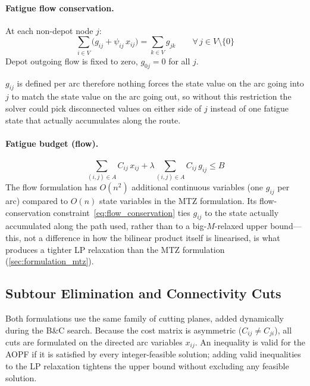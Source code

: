 \documentclass[11pt,a4paper]{article}
\begin{document}
\paragraph{Fatigue flow conservation.}
At each non-depot node $j$:
\begin{equation}
  \sum_{i \in V} \bigl(g_{ij} + \psi_{ij} \, x_{ij}\bigr) = \sum_{k \in V} g_{jk} \qquad \forall\, j \in V \setminus \{0\}
  \label{eq:flow_conservation}
\end{equation}
Depot outgoing flow is fixed to zero, $g_{0j} = 0$ for all $j$.

$g_{ij}$ is defined per arc therefore nothing forces the state value on the arc going into $j$ to match the state value on the arc going out, so without this restriction the solver could pick disconnected values on either side of $j$ instead of one fatigue state that actually accumulates along the route.

\paragraph{Fatigue budget (flow).}
\begin{equation}
  \sum_{(i,j) \in A} C_{ij} \, x_{ij} + \lambda \sum_{(i,j) \in A} C_{ij} \, g_{ij} \leq B
  \label{eq:fatigue_budget_flow}
\end{equation}
The flow formulation has $O(n^2)$ additional continuous variables (one $g_{ij}$ per arc) compared to $O(n)$ state variables in the MTZ formulation. Its flow-conservation constraint~\eqref{eq:flow_conservation} ties $g_{ij}$ to the state actually accumulated along the path used, rather than to a big-$M$-relaxed upper bound---this, not a difference in how the bilinear product itself is linearised, is what produces a tighter LP relaxation than the MTZ formulation (\cref{sec:formulation_mtz}).

\subsection{Subtour Elimination and Connectivity Cuts}

Both formulations use the same family of cutting planes, added dynamically during the B\&C search.
Because the cost matrix is asymmetric ($C_{ij} \neq C_{ji}$), all cuts are formulated on the directed arc variables $x_{ij}$.
An inequality is valid for the AOPF if it is satisfied by every integer-feasible solution; adding valid inequalities to the LP relaxation tightens the upper bound without excluding any feasible solution.
\end{document}
